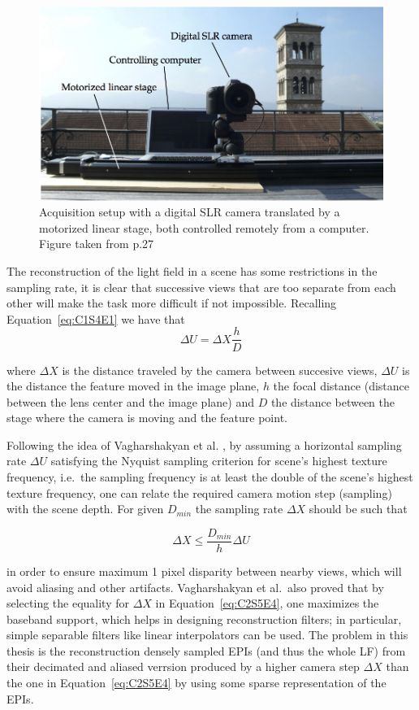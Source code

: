 \begin{figure}[h!]
\centering
\includegraphics[width = 0.93 \textwidth]{./Diagrams/setting.jpg}
\caption{Acquisition setup with a digital SLR camera translated by a motorized linear stage, both controlled remotely from a computer. Figure taken from \cite{ChangilPhD} p.27}
\label{fig:setting}
\end{figure}

\bigskip

The reconstruction of the light field in a scene has some restrictions in the sampling rate, it is clear that successive views that are too separate from each other will make the task more difficult if not impossible. Recalling Equation~\ref{eq:C1S4E1} we have that 
$$
\Delta U = \Delta X\frac{h}{D}
$$

where $\Delta X$ is the distance traveled by the camera between succesive views, $\Delta U$ is the distance the feature moved in the image plane, $h$ the focal distance (distance between the lens center and the image plane) and $D$ the distance between the stage where the camera is moving and the feature point. 

\bigskip

Following the idea of Vagharshakyan et al. \cite{LF-Shearlets}, by assuming a horizontal sampling rate $\Delta U$ satisfying the Nyquist sampling criterion for scene's highest texture frequency, i.e.\ the sampling frequency is at least the double of the scene's highest texture frequency, one can relate the required camera motion step (sampling) with the scene depth. For given $D_{min}$ the sampling rate $\Delta X$ should be such that 

\begin{equation}
\label{eq:C2S5E4}
\Delta X \leq \frac{D_{min}}{h}\Delta U
\end{equation}

in order to ensure maximum 1 pixel disparity between nearby views, which will avoid aliasing and other artifacts. Vagharshakyan et al.\ also proved that by selecting the equality for $\Delta X$ in Equation~\ref{eq:C2S5E4}, one maximizes the baseband support, which helps in designing reconstruction filters; in particular, simple separable filters like linear interpolators can be used. The problem in this thesis is the reconstruction densely sampled EPIs (and thus the whole LF) from their decimated and aliased verrsion produced by a higher camera step $\Delta X$ than the one in Equation~\ref{eq:C2S5E4} by using some sparse representation of the EPIs. 


